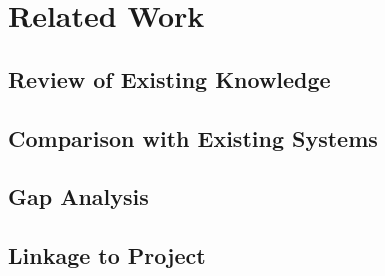 \section{Related Work}
\label{sec:related-work}

\subsection{Review of Existing Knowledge}
\label{subsec:review-of-existing-knowledge}

\subsection{Comparison with Existing Systems}
\label{subsec:comparison-with-existing-systems}

\subsection{Gap Analysis}
\label{subsec:gap-analysis}

\subsection{Linkage to Project}
\label{subsec:linkage-to-project}